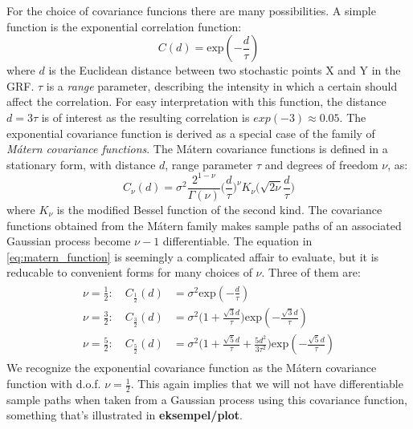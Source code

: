 \documentclass{article}
\begin{document}
For the choice of covariance funcions there are many possibilities. A simple function is the exponential correlation function:
\begin{equation*}
C(d) = \text{exp}(-\frac{d}{\tau})
\end{equation*}
where $d$ is the Euclidean distance between two stochastic points X and Y in the GRF. $\tau$ is a \textit{range} parameter, describing the intensity in which a certain should affect the correlation. For easy interpretation with this function, the distance $d = 3\tau$ is of interest as the resulting correlation is $exp(-3) \approx 0.05$.
The exponential covariance function is derived as a special case of the family of \textit{Mátern covariance functions}. The Mátern covariance functions is defined in a stationary form, with distance $d$, range parameter $\tau$ and degrees of freedom $\nu$, as:
\begin{equation}
\label{eq:matern_function}
C_{\nu}(d) = \sigma^2 \frac{2^{1-\nu}}{\Gamma(\nu)}\bigg( \frac{d}{\tau} \bigg)^{\nu} K_{\nu} \bigg( \sqrt{2\nu}\frac{d}{\tau} \bigg)
\end{equation}
where $K_{\nu}$ is the modified Bessel function of the second kind. The covariance functions obtained from the Mátern family makes sample paths of an associated Gaussian process become $\nu - 1$ differentiable. The equation in \ref{eq:matern_function} is seemingly a complicated affair to evaluate, but it is reducable to convenient forms for many choices of $\nu$. Three of them are:
\begin{align} \label{eq:covariance_functions}
\begin{split}
\nu = \frac{1}{2}: \quad C_{\frac{1}{2}}(d) &= \sigma^2\text{exp}(-\frac{d}{\tau}) \\
\nu = \frac{3}{2}: \quad C_{\frac{3}{2}}(d) &= \sigma^2 \bigg(1  +
\frac{\sqrt{3}d}{\tau} \bigg) \text{exp}(-\frac{\sqrt{3}d}{\tau}) \\
\nu = \frac{5}{2}: \quad C_{\frac{5}{2}}(d) &= \sigma^2 \bigg(1  +
\frac{\sqrt{5}d}{\tau} + \frac{5d^2}{3\tau^2}\bigg) \text{exp}(-\frac{\sqrt{5}d}{\tau})
\end{split}
\end{align}
We recognize the exponential covariance function as the Mátern covariance function with d.o.f. $\nu = \frac{1}{2}$. This again implies that we will not have differentiable sample paths when taken from a Gaussian process using this covariance function, something that's illustrated in \textbf{eksempel/plot}.  
\end{document}

